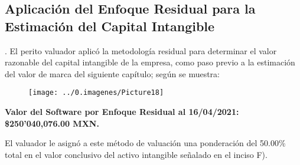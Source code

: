 \subsection{Aplicaci\'on del Enfoque Residual para la Estimaci\'on del Capital Intangible}. El perito valuador aplic\'o la metodolog\'ia residual para determinar el valor razonable del capital intangible de la empresa, como paso previo a la estimaci\'on del valor de marca del siguiente cap\'itulo; seg\'un se muestra:\\

\begin{figure}[H]
\centering
\texttt{[image: ../0.imagenes/Picture18]}
\end{figure}

\begin{center}
\textcolor{principal}{\textbf{Valor del Software por Enfoque Residual al 16/04/2021: \$250'040,076.00 MXN.}}
\end{center}

El valuador le asign\'o a este m\'etodo de valuaci\'on una ponderaci\'on del 50.00\% total en el valor conclusivo del activo intangible se\~nalado en el inciso F).
